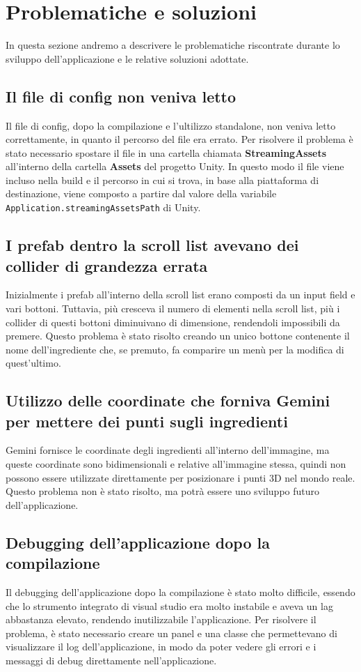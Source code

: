 \section{Problematiche e soluzioni}
In questa sezione andremo a descrivere le problematiche riscontrate durante lo sviluppo dell'applicazione e le relative soluzioni adottate.
\subsection{Il file di config non veniva letto}
Il file di config, dopo la compilazione e l'ultilizzo standalone, non veniva letto correttamente, in quanto il percorso del file era errato. Per risolvere il problema è stato necessario spostare il file in una cartella chiamata \textbf{StreamingAssets} all'interno della cartella \textbf{Assets} del progetto Unity. In questo modo il file viene incluso nella build e il percorso in cui si trova, in base alla piattaforma di destinazione, viene composto a partire dal valore della variabile \texttt{Application.streamingAssetsPath} di Unity.

\subsection{I prefab dentro la scroll list avevano dei collider di grandezza errata}
Inizialmente i prefab all'interno della scroll list erano composti da un input field e vari bottoni. Tuttavia, più cresceva il numero di elementi nella scroll list, più i collider di questi bottoni diminuivano di dimensione, rendendoli impossibili da premere. Questo problema è stato risolto creando un unico bottone contenente il nome dell'ingrediente che, se premuto, fa comparire un menù per la modifica di quest'ultimo.
\subsection{Utilizzo delle coordinate che forniva Gemini per mettere dei punti sugli ingredienti}
Gemini fornisce le coordinate degli ingredienti all'interno dell'immagine, ma queste coordinate sono bidimensionali e relative all'immagine stessa, quindi non possono essere utilizzate direttamente per posizionare i punti 3D nel mondo reale. Questo problema non è stato risolto, ma potrà essere uno sviluppo futuro dell'applicazione.

\subsection{Debugging dell'applicazione dopo la compilazione}
Il debugging dell'applicazione dopo la compilazione è stato molto difficile, essendo che lo strumento integrato di visual studio era molto instabile e aveva un lag abbastanza elevato, rendendo inutilizzabile l'applicazione. Per risolvere il problema, è stato necessario creare un panel e una classe che permettevano di visualizzare il log dell'applicazione, in modo da poter vedere gli errori e i messaggi di debug direttamente nell'applicazione.